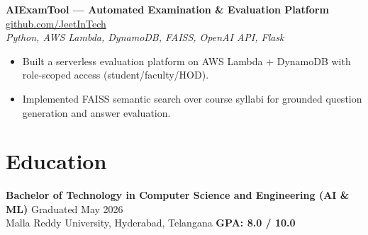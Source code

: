 \documentclass[10pt]{article}
\newcommand{\educationSection}{
\section*{Education}
\textbf{Bachelor of Technology in Computer Science and Engineering (AI \& ML)} \hfill Graduated May 2026 \\
Malla Reddy University, Hyderabad, Telangana \hfill \textbf{GPA: 8.0 / 10.0}
}
\begin{document}
\vspace{1.5pt}
\textbf{AIExamTool — Automated Examination \& Evaluation Platform} \hfill \href{https://github.com/JeetInTech}{github.com/JeetInTech} \\
\textit{Python, AWS Lambda, DynamoDB, FAISS, OpenAI API, Flask}
\begin{itemize}
    \item Built a serverless evaluation platform on AWS Lambda + DynamoDB with role-scoped access (student/faculty/HOD).
    \item Implemented FAISS semantic search over course syllabi for grounded question generation and answer evaluation.
\end{itemize}

\educationSection
\end{document}

